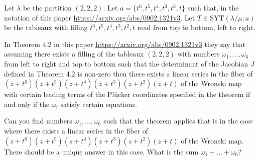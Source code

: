 Let $\lambda$ be the partition $(2,2,2)$. Let $a=\{t^6,t^5,t^4,t^3,t^2,t\}$ such that, in the notation of this paper \url{https://arxiv.org/abs/0902.1321v3}. Let $T\in \mathrm{SYT}(\lambda/\mu;a)$ be the tableaux with filling $t^6,t^5,t^4,t^3,t^2,t$ read from top to bottom, left to right.

In Theorem 4.2 in this paper \url{https://arxiv.org/abs/0902.1321v3} they say that assuming there exists a filling of the tableaux $(2,2,2)$ with numbers $\omega_1,\ldots,\omega_6$ from left to right and top to bottom such that the determinant of the Jacobian $J$ defined in Theorem 4.2 is non-zero then there exists a linear series in the fiber of $(z+t^6)(z+t^5)(z+t^4)(z+t^3)(z+t^2)(z+t)$ of the Wronski map with certain leading terms of the Pl\"ucker coordinates specified in the theorem if and only if the $\omega_i$ satisfy certain equations.

Can you find numbers $\omega_1,\ldots,\omega_6$ such that the theorem applies that is in the case where there exists a linear series in the fiber of $(z+t^6)(z+t^5)(z+t^4)(z+t^3)(z+t^2)(z+t)$ of the Wronski map. There should be a unique answer in this case. What is the sum $\omega_1+\ldots +\omega_6$?
